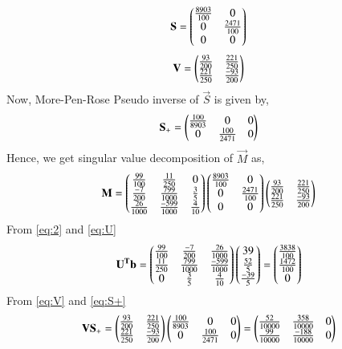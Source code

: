 \documentclass[journal,12pt,twocolumn]{IEEEtran}
\begin{document}
\begin{align}
	 \mathbf{S} = \begin{pmatrix}\frac{8903}{100} & 0 \\ 0 & \frac{2471}{100}  \\ 0 & 0 \end{pmatrix}
\end{align} \label{eq:S}
\begin{align}
	 \mathbf{V} = \begin{pmatrix}\frac{93}{200} & \frac{221}{250} \\ \frac{221}{250} & \frac{-93}{200} \end{pmatrix} \label{eq:V}
\end{align}
Now, More-Pen-Rose Pseudo inverse of $\vec{S}$ is given by,
\begin{align}
	 \mathbf{S_+} = \begin{pmatrix}\frac{100}{8903} & 0 & 0 \\ 0 & \frac{100}{2471} & 0 \end{pmatrix} \label{eq:S+}
\end{align} 
Hence, we get singular value decomposition of $\vec{M}$ as,
\begin{align}
	 \mathbf{M} = \begin{pmatrix}\frac{99}{100} & \frac{11}{250} & 0 \\ \frac{-7}{200} & \frac{799}{1000} & \frac{3}{5} \\ \frac{26}{1000} & \frac{-599}{1000} & \frac{4}{10}\end{pmatrix}\begin{pmatrix}\frac{8903}{100} & 0 \\ 0 & \frac{2471}{100}  \\ 0 & 0\end{pmatrix} \begin{pmatrix}\frac{93}{200} & \frac{221}{250} \\ \frac{221}{250} & \frac{-93}{200} \end{pmatrix}
\end{align}
From \eqref{eq:2} and \eqref{eq:U}
\begin{align}
	 \mathbf{U^Tb} = \begin{pmatrix}\frac{99}{100} & \frac{-7}{200} & \frac{26}{1000} \\ \frac{11}{250} & \frac{799}{1000} & \frac{-599}{1000} \\ 0 & \frac{3}{5} & \frac{4}{10} \end{pmatrix}\begin{pmatrix}39 \\ \frac{52}{5} \\ \frac{-39}{5}\end{pmatrix} = \begin{pmatrix}\frac{3838}{100}\\ \frac{1472}{100}\\ 0\end{pmatrix} \label{eq:UTb}
\end{align}
From \eqref{eq:V} and \eqref{eq:S+}
\begin{align}
	 \mathbf{VS_+} = \begin{pmatrix}\frac{93}{200} & \frac{221}{250} \\ \frac{221}{250} & \frac{-93}{200} \end{pmatrix}\begin{pmatrix}\frac{100}{8903} & 0 & 0 \\ 0 & \frac{100}{2471} & 0 \end{pmatrix} = \begin{pmatrix}\frac{52}{10000} & \frac{358}{10000} & 0 \\ \frac{99}{10000} & \frac{-188}{10000} & 0 \end{pmatrix}\label{eq:VS}
\end{align}
\end{document}
